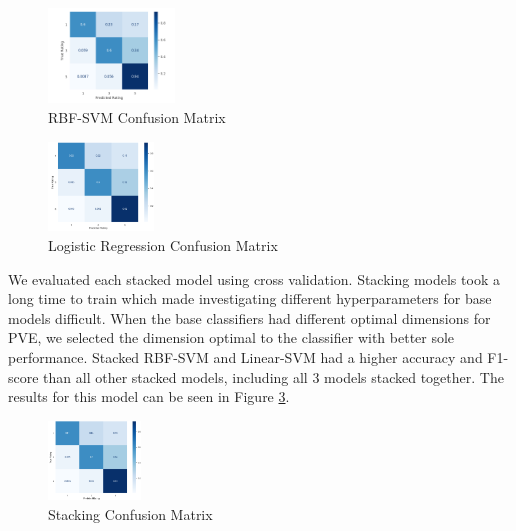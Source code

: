 \documentclass[11pt]{article}
\begin{document}
\begin{figure}
	\centering
	\includegraphics[width = 0.3\textwidth]{fig-rbf-cm.png}
	\caption{RBF-SVM Confusion Matrix}
	\label{fig:rbf-cm}
\end{figure}

\begin{figure}
	\centering
	\includegraphics[width = 0.25\textwidth]{fig-lr-cm.png}
	\caption{Logistic Regression Confusion Matrix}
	\label{fig:lr-cm}
\end{figure}


We evaluated each stacked model using cross validation. Stacking models took a long time to train which made investigating different hyperparameters for base models difficult. When the base classifiers had different optimal dimensions for PVE, we selected the dimension optimal to the classifier with better sole performance. Stacked RBF-SVM and Linear-SVM had a higher accuracy and F1-score than all other stacked models, including all 3 models stacked together. The results for this model can be seen in Figure \ref{fig:stack-cm}.
\begin{figure}
	\centering
	\includegraphics[width = 0.22\textwidth]{fig-stack-cm.png}
	\caption{Stacking Confusion Matrix}
	\label{fig:stack-cm}
\end{figure}
\end{document}
